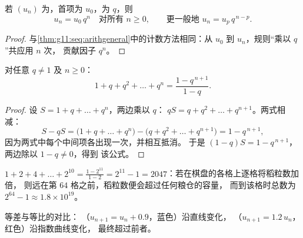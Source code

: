 \begin{theorem}[通项公式]\label{thm:g11:seq:geomgeneral}
若 $(u_n)$ 为，首项为 $u_0$，为 $q$，则
\[
u_n = u_0\, q^n \quad \text{对所有 } n \geq 0,
\qquad\text{更一般地 } u_n = u_p\, q^{\,n-p} .
\]
\end{theorem}

\begin{proof}
与\cref{thm:g11:seq:arithgeneral}中的计数方法相同：从 $u_0$ 到
$u_n$，规则“乘以 $q$”共应用 $n$ 次，
贡献因子 $q^n$。
\end{proof}

\begin{theorem}[等比数列求和]\label{thm:g11:seq:geomsum}
对任意 $q \neq 1$ 及 $n \geq 0$：
\[
1 + q + q^2 + \dots + q^n = \frac{1 - q^{\,n+1}}{1 - q}.
\]
\end{theorem}

\begin{proof}
设 $S = 1 + q + \dots + q^n$，两边乘以 $q$：
$qS = q + q^2 + \dots + q^{n+1}$。两式相减：
\[
S - qS = \bigl(1 + q + \dots + q^n\bigr)
- \bigl(q + q^2 + \dots + q^{n+1}\bigr) = 1 - q^{\,n+1},
\]
因为两式中每个中间项各出现一次，并相互抵消。
于是 $(1 - q)S = 1 - q^{\,n+1}$，两边除以 $1 - q \neq 0$，得到
该公式。
\end{proof}

\begin{example}\label{ex:g11:seq:chessboard}
$1 + 2 + 4 + \dots + 2^{10} = \frac{1 - 2^{11}}{1 - 2} = 2^{11} - 1 =
2047$：若在棋盘的各格上逐格将稻粒数加倍，
则远在第 $64$ 格之前，稻粒数便会超过任何粮仓的容量，
而到该格时总数为 $2^{64} - 1 \approx 1.8 \times 10^{19}$。
\end{example}

\begin{omfigure}

{\small 等差与等比的对比：
（$u_{n+1} = u_n + 0.9$，蓝色）沿直线变化，
（$u_{n+1} = 1.2\,u_n$，红色）沿指数曲线变化，
最终超过前者。}
\end{omfigure}

